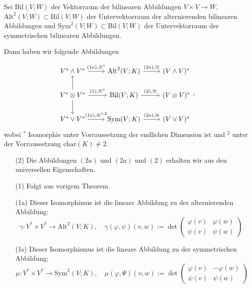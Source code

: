 \documentclass[9pt, a4paper, twocolumn, landscape]{article}
\begin{document}
\begin{example}
Sei $\mathrm{Bil}(V; W)$ der Vektorraum der bilinearen Abbildungen $V \times V \rightarrow W$, $\mathrm{Alt}^2(V; W) \subset \mathrm{Bil}(V; W)$ der Untervektorraum der alternierenden bilinearen Abbildungen und $\mathrm{Sym}^2(V;W) \subset \mathrm{Bil}(V; W)$ der Untervektorraum der symmetrischen bilinearen Abbildungen.

Dann haben wir folgende Abbildungen 

\begin{equation*}
\begin{tikzcd}
V^* \wedge V^* \arrow[r, "{(1a), \cong^*}"]                     & \mathrm{Alt}^2(V;K) \arrow[r, "{(2a), \cong}"] & (V \wedge V)^*  \\
V^* \otimes V^* \arrow[u] \arrow[r, "{(1), \cong^*}"] \arrow[d] & \mathrm{Bil}(V;K) \arrow[r, "{(2), \cong}"]    & (V \otimes V)^* \\
V^* \vee V^* \arrow[r, "{(1s), \cong^{*,2}}"]                   & \mathrm{Sym}(V;K) \arrow[r, "{(2s), \cong}"]   & (V \vee V)^*   
\end{tikzcd},
\end{equation*}
wobei $^*$ Isomorphie unter Vorraussetzung der endlichen Dimension ist und $^2$  unter der Vorraussetzung $\mathrm{char}(K) \neq 2.$
\begin{enumerate}
\item[(2)] Die Abbildungen $(2a)$ und $(2a)$ und $(2)$ erhalten wir aus den universellen Eigenschaften.
\item[(1)] Folgt aus vorigem Theorem.
\item[(1a)]
Dieser Isomorphimus ist die lineare Abbildung zu der alternierenden Abbildung:
$$ 
\gamma: V^* \times V^* \rightarrow \mathrm{Alt}^2(V;K), \quad
\gamma(\varphi, \psi)(v, w):=\operatorname{det}\left(\begin{array}{cc}\varphi(v) & \varphi(w) \\ \psi(v) & \psi(w)\end{array}\right).
$$
\item[(1s)]
Dieser Isomorphismus ist die lineare Abbildung zu der symmetrischen Abbildung:
$$
\mu: V^* \times V^* \rightarrow \mathrm{Sym}^2 (V;K)
, \quad 
\mu(\varphi, \Psi)(v, w) := \operatorname{det}\left(\begin{array}{cc}\varphi(v) & - \varphi(w) \\ \psi(v) & \psi(w)\end{array}\right)
$$
\end{enumerate}
\end{example}
\end{document}
